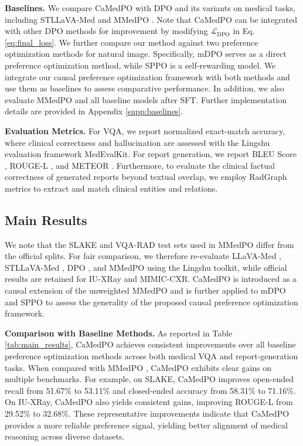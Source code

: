 \noindent\textbf{Baselines.}
We compare CaMedPO with DPO \cite{rafailov2023direct} and its variants on medical tasks, including STLLaVA-Med \cite{sun2024stllava} and MMedPO \cite{Zhu2025MMedPO}. Note that CaMedPO can be integrated with other DPO methods for improvement by modifying $\mathcal{L}_\text{DPO}$ in Eq. \ref{eq:final_loss}. We further compare our method against two preference optimization methods for natural image. Specifically, mDPO \cite{wang2024mdpo} serves as a direct preference optimization method, while SPPO \cite{wu2025selfplay} is a self-rewarding model. We integrate our causal preference optimization framework with both methods and use them as baselines to assess comparative performance. In addition, we also evaluate MMedPO and all baseline models after SFT. Further implementation details are provided in Appendix \ref{supp:baselines}.

\noindent\textbf{Evaluation Metrics.}
For VQA, we report normalized exact-match accuracy, where clinical correctness and hallucination are assessed with the Lingshu \cite{xu2025lingshu} evaluation framework MedEvalKit. For report generation, we report BLEU Score \cite{papineni2002bleu}, ROUGE-L \cite{papineni2002bleu}, and METEOR \cite{banerjee2005meteor}. Furthermore, to evaluate the clinical factual correctness of generated reports beyond textual overlap, we employ RadGraph \cite{jain2021radgraph} metrics to extract and match clinical entities and relations.

\subsection{Main Results}
We note that the SLAKE and VQA-RAD test sets used in MMedPO differ from the official splits. For fair comparison, we therefore re-evaluate LLaVA-Med \cite{Li2023LLaVAMed}, STLLaVA-Med \cite{sun2024stllava}, DPO \cite{rafailov2023direct}, and MMedPO \cite{Zhu2025MMedPO} using the Lingshu toolkit, while official results are retained for IU-XRay and MIMIC-CXR. CaMedPO is introduced as a causal extension of the unweighted MMedPO and is further applied to mDPO \cite{wang2024mdpo} and SPPO \cite{wu2025selfplay} to assess the generality of the proposed causal preference optimization framework.

\noindent\textbf{Comparison with Baseline Methods.}
As reported in Table \ref{tab:main_results}, CaMedPO achieves consistent improvements over all baseline preference optimization methods across both medical VQA and report-generation tasks. When compared with MMedPO \cite{Zhu2025MMedPO}, CaMedPO exhibits clear gains on multiple benchmarks. For example, on SLAKE, CaMedPO improves open-ended recall from 51.67\% to 53.11\% and closed-ended accuracy from 58.31\% to 71.16\%. On IU-XRay, CaMedPO also yields consistent gains, improving ROUGE-L from 29.52\% to 32.68\%. These representative improvements indicate that CaMedPO provides a more reliable preference signal, yielding better alignment of medical reasoning across diverse datasets.

